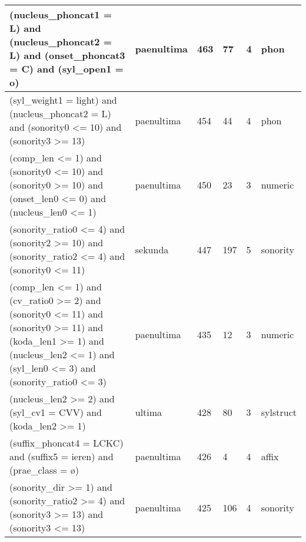 \begin{table}
\begin{tabular}{|p{8cm}l|ll|ll|}
(nucleus\_phoncat1 = L) and (nucleus\_phoncat2 = L) and (onset\_phoncat3 = C) and (syl\_open1 = o)                                                                                                                                                          & paenultima     & 463 & 77  & 4 & phon      \\\hline
(syl\_weight1 = light) and (nucleus\_phoncat2 = L) and (sonority0 \textless= 10) and (sonority3 \textgreater= 13)                                                                                                                                           & paenultima     & 454 & 44  & 4 & phon      \\\hline
(comp\_len \textless= 1) and (sonority0 \textless= 10) and (sonority0 \textgreater= 10) and (onset\_len0 \textless= 0) and (nucleus\_len0 \textless= 1)                                                                                                     & paenultima     & 450 & 23  & 3 & numeric   \\\hline
(sonority\_ratio0 \textless= 4) and (sonority2 \textgreater= 10) and (sonority\_ratio2 \textless= 4) and (sonority0 \textless= 11)                                                                                                                          & sekunda        & 447 & 197 & 5 & sonority  \\\hline
(comp\_len \textless= 1) and (cv\_ratio0 \textgreater= 2) and (sonority0 \textless= 11) and (sonority0 \textgreater= 11) and (koda\_len1 \textgreater= 1) and (nucleus\_len2 \textless= 1) and (syl\_len0 \textless= 3) and (sonority\_ratio0 \textless= 3) & paenultima     & 435 & 12  & 3 & numeric   \\\hline
(nucleus\_len2 \textgreater= 2) and (syl\_cv1 = CVV) and (koda\_len2 \textgreater= 1)                                                                                                                                                                       & ultima         & 428 & 80  & 3 & sylstruct \\\hline
(suffix\_phoncat4 = LCKC) and (suffix5 = ieren) and (prae\_class = ø)                                                                                                                                                                                       & paenultima     & 426 & 4   & 4 & affix     \\\hline
(sonority\_dir \textgreater= 1) and (sonority\_ratio2 \textgreater= 4) and (sonority3 \textgreater= 13) and (sonority3 \textless= 13)                                                                                                                       & paenultima     & 425 & 106 & 4 & sonority  \\\hline

\end{tabular}
\end{table}
